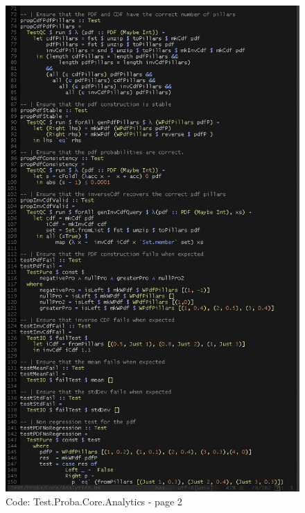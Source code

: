 \documentclass[12pt,a4paper,titlepage]{article}
\begin{document}
\begin{figure}[h!]
\centering
\includegraphics[width=1\textwidth]{img/code-test-analytics-2.png}
\caption{Code: Test.Proba.Core.Analytics - page 2}
\label{fig:test.a2}
\end{figure}
\end{document}
